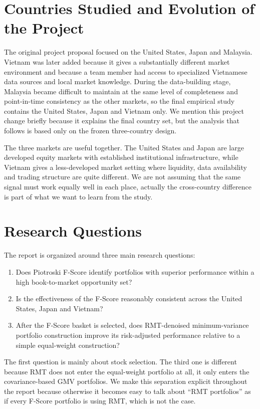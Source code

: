 \documentclass[11pt,a4paper]{report}
\numberwithin{figure}{chapter}
\numberwithin{table}{chapter}
\numberwithin{equation}{chapter}
\begin{document}
\section{Countries Studied and Evolution of the Project}

The original project proposal focused on the United States, Japan and Malaysia. Vietnam was later added because it gives a substantially different market environment and because a team member had access to specialized Vietnamese data sources and local market knowledge. During the data-building stage, Malaysia became difficult to maintain at the same level of completeness and point-in-time consistency as the other markets, so the final empirical study contains the United States, Japan and Vietnam only. We mention this project change briefly because it explains the final country set, but the analysis that follows is based only on the frozen three-country design.

The three markets are useful together. The United States and Japan are large developed equity markets with established institutional infrastructure, while Vietnam gives a less-developed market setting where liquidity, data availability and trading structure are quite different. We are not assuming that the same signal must work equally well in each place, actually the cross-country difference is part of what we want to learn from the study.

\section{Research Questions}
\label{sec:research_questions}

The report is organized around three main research questions:

\begin{enumerate}[label=\textbf{RQ\arabic*:}, leftmargin=1.6cm]
    \item Does Piotroski F-Score identify portfolios with superior performance within a high book-to-market opportunity set?
    \item Is the effectiveness of the F-Score reasonably consistent across the United States, Japan and Vietnam?
    \item After the F-Score basket is selected, does RMT-denoised minimum-variance portfolio construction improve its risk-adjusted performance relative to a simple equal-weight construction?
\end{enumerate}

The first question is mainly about stock selection. The third one is different because RMT does not enter the equal-weight portfolio at all, it only enters the covariance-based GMV portfolios. We make this separation explicit throughout the report because otherwise it becomes easy to talk about ``RMT portfolios'' as if every F-Score portfolio is using RMT, which is not the case.
\end{document}
